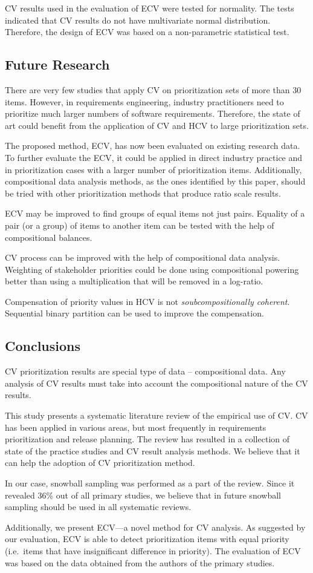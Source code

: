 CV results used in the evaluation of ECV were tested for normality.
The tests indicated that CV results do not have multivariate normal distribution.
Therefore, the design of ECV was based on a non-parametric statistical test.

\subsection{Future Research}
There are very few studies that apply CV on prioritization sets of more than 30 items.
However, in requirements engineering, industry practitioners need to prioritize much larger numbers of software requirements.
Therefore, the state of art could benefit from the application of CV and HCV to large prioritization sets.

The proposed method, ECV, has now been evaluated on existing research data. To further evaluate the ECV, it could be applied in direct industry practice and in prioritization cases with a larger number of prioritization items.
Additionally, compositional data analysis methods, as the ones identified by this paper, should be tried with other prioritization methods that produce ratio scale results.

ECV may be improved to find groups of equal items not just pairs.
Equality of a pair (or a group) of items to another item can be tested with the help of compositional  balances.

CV process can be improved with the help of compositional data analysis.
Weighting of stakeholder priorities could be done using compositional powering better than using a multiplication that will be removed in a log-ratio.

Compensation of priority values in HCV is not \emph{soubcompositionally coherent}. Sequential binary partition can be used to improve the compensation.

\subsection{Conclusions}
CV prioritization results are special type of data -- compositional data.
Any analysis of CV results must take into account the compositional nature of the CV results.

This study presents a systematic literature review of the empirical use of CV.
CV has been applied in various areas, but most frequently in requirements prioritization and release planning.
The review has resulted in a collection of state of the practice studies and CV result analysis methods.
We believe that it can help the adoption of CV prioritization method.

In our case, snowball sampling was performed as a part of the review.
Since it revealed 36\% out of all primary studies, 
we believe that in future snowball sampling should be used in all systematic reviews.

Additionally, we present ECV---a novel method for CV analysis.
As suggested by our evaluation, ECV is able to detect prioritization items with equal priority (i.e.\ items that have insignificant difference in priority).
The evaluation of ECV was based on the data obtained from the authors of the primary studies.